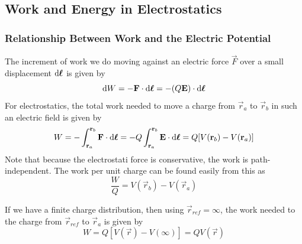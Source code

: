 \documentclass[a4paper]{article}
\begin{document}
\subsection{Work and Energy in Electrostatics}
\subsubsection{Relationship Between Work and the Electric Potential}
The increment of work we do moving against an electric force $\vec{F}$ over a
small displacement $\mathrm{d}\boldsymbol{\mathbf{\ell}}$ is given by
\[ \mathrm{d} W = -\boldsymbol{\mathbf{F}}\cdot\mathrm{d}\boldsymbol{\mathbf{\ell}} = -(Q\boldsymbol{\mathbf{E}})\cdot\mathrm{d}\boldsymbol{\mathbf{\ell}} \]
For electrostatics, the total work needed to move a charge from
$\vec{r}_a$ to $\vec{r}_b$ in such an electric field is given by
\[ W = -\int_{\boldsymbol{\mathbf{r}}_a}^{\boldsymbol{\mathbf{r}}_b}\boldsymbol{\mathbf{F}}\cdot\mathrm{d}\boldsymbol{\mathbf{\ell}}
= -Q\int_{\boldsymbol{\mathbf{r}}_a}^{\boldsymbol{\mathbf{r}}_b}\boldsymbol{\mathbf{E}}\cdot\mathrm{d}\boldsymbol{\mathbf{\ell}} 
= Q[V(\boldsymbol{\mathbf{r}}_b) - V(\boldsymbol{\mathbf{r}}_a)] \]
Note that because the electrostati force is conservative, the work
is path-independent. The work per unit charge can be found easily from this
as
\[ \frac{W}{Q} = V(\vec{r}_b)-V(\vec{r}_a) \]

If we have a finite charge distribution, then using $\vec{r}_{ref} = \infty$,
the work needed to the charge from $\vec{r}_{ref}$ to $\vec{r}_a$ is given by
\[ W = Q[V(\vec{r})-V(\infty)] = QV(\vec{r}) \]
\end{document}
